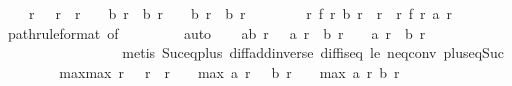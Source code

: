 \begin{isabellebody}
\ \ \ \ {\isachardoublequoteopen}{\isasymforall}r{\isachardot}\ {}\ {\isacharless}\ r\ {\isasymand}\ r\ {\isacharless}\ {}{}{}{}\ {\isasymlongrightarrow}\ b\ r\ {\isacharequal}\ b\ {\isacharparenleft}r\ {\isacharminus}\ {}{\isacharparenright}\ {\isasymor}\ b\ r\ {\isacharequal}\ b\ {\isacharparenleft}r\ {\isacharminus}\ {}{\isacharparenright}\ {\isacharplus}\ {}{\isachardoublequoteclose}\isanewline
\ \ \ \ {\isachardoublequoteopen}{\isasymforall}r{\isacharless}{}{}{}{}{\isachardot}\ f\ r\ {\isacharparenleft}b\ r{\isacharparenright}\ {\isacharequal}\ {\isacharparenleft}{\isasymSum}r{\isacharprime}\ {\isasymleftarrow}\ {\isacharbrackleft}{}{\isachardot}{\isachardot}{\isacharless}r{\isacharplus}{}{\isacharbrackright}{\isachardot}\ f\ r{\isacharprime}\ {\isacharparenleft}a\ r{\isacharprime}{\isacharparenright}{\isacharparenright}{\isachardoublequoteclose}\isanewline
\ \ \ \ \isamarkupfalse%
\ path{\isacharbrackleft}rule{\isacharunderscore}format{\isacharcomma}\ of\ {}\ {}\ {}{}{}{}{\isacharbrackright}\isanewline
\ \ \ \ \isamarkupfalse%
\ auto\isanewline
\isanewline
\ \ \isamarkupfalse%
\ ab{\isacharcolon}\ {\isachardoublequoteopen}{\isasymforall}r\ {\isacharless}\ {}{}{}{}{\isachardot}\ a\ r\ {\isacharequal}\ b\ r\ {\isacharplus}\ {}\ {\isasymor}\ a\ r\ {\isacharequal}\ b\ r\ {\isacharminus}\ {}{\isachardoublequoteclose}\isanewline
\ \ \ \ \isamarkupfalse%
\ {\isacharasterisk}{\isacharparenleft}{}{\isacharminus}{}{\isacharparenright}\ {\isacharasterisk}{\isacharparenleft}{}{\isacharminus}{}{\isacharparenright}\ \ \ \ \ \ \ \ \ \isanewline
\ \ \ \ \isamarkupfalse%
\ {\isacharparenleft}metis\ Suc{\isacharunderscore}eq{\isacharunderscore}plus{}\ diff{\isacharunderscore}add{\isacharunderscore}inverse\ diff{\isacharunderscore}is{\isacharunderscore}{}{\isacharunderscore}eq{\isacharprime}\ le{}\ neq{}{\isacharunderscore}conv\ plus{\isacharunderscore}{}{\isacharunderscore}eq{\isacharunderscore}Suc{\isacharparenright}\isanewline
\ \ \ \ \isanewline
\ \ \isamarkupfalse%
\ max{\isacharunderscore}max{\isacharcolon}\ {\isachardoublequoteopen}{\isasymforall}r{\isachardot}\ {}\ {\isacharless}\ r\ {\isasymand}\ r\ {\isacharless}\ {}{}{}{}\ {\isasymlongrightarrow}\ max\ {\isacharparenleft}a\ {\isacharparenleft}r\ {\isacharminus}\ {}{\isacharparenright}{\isacharparenright}\ {\isacharparenleft}b\ {\isacharparenleft}r\ {\isacharminus}\ {}{\isacharparenright}{\isacharparenright}\ {\isasymle}\ max\ {\isacharparenleft}a\ r{\isacharparenright}\ {\isacharparenleft}b\ r{\isacharparenright}{\isachardoublequoteclose}\isanewline

\end{isabellebody}
